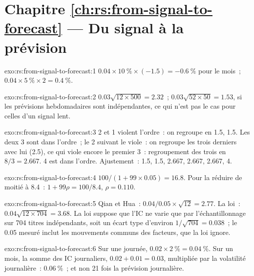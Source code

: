 \section*{Chapitre \ref{ch:rs:from-signal-to-forecast} --- Du signal à la prévision}

\begin{solution}{exo:rs:from-signal-to-forecast:1}
$0.04 \times 10~\% \times (-1.5) = -0.6~\%$ pour le mois~; $0.04 \times 5~\% \times 2 = 0.4~\%$.
\end{solution}

\begin{solution}{exo:rs:from-signal-to-forecast:2}
$0.03\sqrt{12 \times 500} = 2.32$~; $0.03\sqrt{52 \times 50} = 1.53$, si les prévisions hebdomadaires sont indépendantes, ce qui n'est pas le cas pour celles d'un signal lent.
\end{solution}

\begin{solution}{exo:rs:from-signal-to-forecast:3}
2 et 1 violent l'ordre~: on regroupe en 1.5, 1.5. Les deux 3 sont dans l'ordre~; le 2 suivant le viole~: on regroupe les trois derniers avec lui (2.5), ce qui viole encore le premier 3~:
regroupement des trois en $8/3 = 2.667$. 4 est dans l'ordre. Ajustement~: 1.5, 1.5, 2.667, 2.667, 2.667, 4.
\end{solution}

\begin{solution}{exo:rs:from-signal-to-forecast:4}
$100/(1 + 99 \times 0.05) = 16.8$. Pour la réduire de moitié à 8.4~: $1 + 99\rho = 100/8.4$, $\rho = 0.110$.
\end{solution}

\begin{solution}{exo:rs:from-signal-to-forecast:5}
Qian et Hua~: $0.04/0.05 \times \sqrt{12} = 2.77$. La loi~: $0.04\sqrt{12 \times 704} = 3.68$. La loi suppose que l'IC ne varie que par l'échantillonnage
sur 704 titres indépendants, soit un écart type d'environ $1/\sqrt{704} = 0.038$~; le 0.05 mesuré inclut les mouvements communs des facteurs, que la
loi ignore.
\end{solution}

\begin{solution}{exo:rs:from-signal-to-forecast:6}
Sur une journée, $0.02 \times 2~\% = 0.04~\%$. Sur un mois, la somme des IC journaliers, $0.02 + 0.01 = 0.03$, multipliée par la volatilité journalière~: $0.06~\%$~; et non
21 fois la prévision journalière.
\end{solution}

